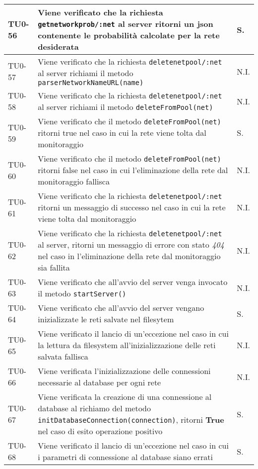 \begin{longtable}{|C{.15\textwidth}|m{.66\textwidth}|C{.10\textwidth}|}
\hline 
TU0-56 & Viene verificato che la richiesta \texttt{getnetworkprob/:net} al server ritorni un json contenente le probabilità calcolate per la rete desiderata & S. \\ 
\hline 
{} TU0-57 & Viene verificato che la richiesta \texttt{deletenetpool/:net} al server richiami il metodo \texttt{parserNetworkNameURL(name)} & N.I. \\ 
\hline
TU0-58 & Viene verificato che la richiesta \texttt{deletenetpool/:net} al server richiami il metodo \texttt{deleteFromPool(net)} & N.I. \\ 
\hline 
{} TU0-59 & Viene verificato che il metodo \texttt{deleteFromPool(net)} ritorni true nel caso in cui la rete viene tolta dal monitoraggio & S. \\ 
\hline
TU0-60 & Viene verificato che il metodo \texttt{deleteFromPool(net)} ritorni false nel caso in cui l'eliminazione della rete dal monitoraggio fallisca & N.I. \\ 
\hline 
{} TU0-61 & Viene verificato che la richiesta \texttt{deletenetpool/:net} ritorni un messaggio di successo nel caso in cui la rete viene tolta dal monitoraggio & N.I. \\ 
\hline 
TU0-62 & Viene verificato che la richiesta \texttt{deletenetpool/:net} al server, ritorni un messaggio di errore con stato \textit{404} nel caso in l'eliminazione della rete dal monitoraggio sia fallita & N.I. \\ 
\hline 
{} TU0-63 & Viene verificato che all'avvio del server venga invocato il metodo \texttt{startServer()} & N.I. \\ 
\hline
TU0-64 & Viene verificato che all'avvio del server vengano inizializzate le reti salvate nel filesytem & S. \\ 
\hline
{}TU0-65 & Viene verificato il lancio di un'eccezione nel caso in cui la lettura da filesystem all'inizializzazione delle reti salvata fallisca & N.I. \\ 
\hline
TU0-66 & Viene verificata l'inizializzazione delle connessioni necessarie al database per ogni rete & N.I. \\ 
\hline
{}TU0-67 &  Viene verificata la creazione di una connessione al database al richiamo del metodo \texttt{initDatabaseConnection(connection)}, ritorni \textbf{True} nel caso di esito operazione positivo & S.\\ 
\hline
TU0-68 & Viene verificato il lancio di un'eccezione nel caso in cui i parametri di connessione al database siano errati & S. \\

\end{longtable}
